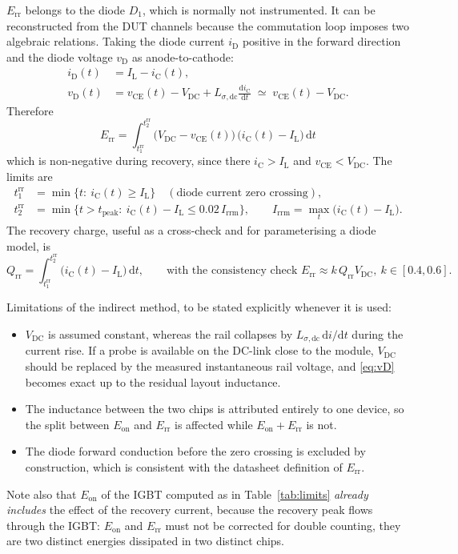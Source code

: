 \documentclass[11pt,a4paper]{article}
\newcommand{\Eon}{E_{\mathrm{on}}}
\newcommand{\Err}{E_{\mathrm{rr}}}
\newcommand{\vce}{v_{\mathrm{CE}}}
\newcommand{\ic}{i_{\mathrm{C}}}
\newcommand{\Vdc}{V_{\mathrm{DC}}}
\newcommand{\IL}{I_{\mathrm{L}}}
\begin{document}
$\Err$ belongs to the diode $D_1$, which is normally not instrumented. It can be
reconstructed from the DUT channels because the commutation loop imposes two algebraic
relations. Taking the diode current $i_{\mathrm{D}}$ positive in the forward direction and
the diode voltage $v_{\mathrm{D}}$ as anode-to-cathode:
\begin{align}
i_{\mathrm{D}}(t) &= \IL - \ic(t), \label{eq:iD}\\
v_{\mathrm{D}}(t) &= \vce(t) - \Vdc + L_{\sigma,\mathrm{dc}}\frac{\mathrm{d}\ic}{\mathrm{d}t}
\;\simeq\; \vce(t)-\Vdc . \label{eq:vD}
\end{align}
Therefore
\begin{equation}
\boxed{\;
\Err = \int_{t_1^{\mathrm{rr}}}^{t_2^{\mathrm{rr}}}
\big(\Vdc-\vce(t)\big)\,\big(\ic(t)-\IL\big)\,\mathrm{d}t \;}
\label{eq:Err}
\end{equation}
which is non-negative during recovery, since there $\ic>\IL$ and $\vce<\Vdc$. The limits
are
\begin{align}
t_1^{\mathrm{rr}} &= \min\{t:\ \ic(t)\ge \IL\} \quad(\text{diode current zero crossing}),\\
t_2^{\mathrm{rr}} &= \min\{t>t_{\mathrm{peak}}:\ \ic(t)-\IL \le 0.02\,I_{\mathrm{rrm}}\},
\qquad I_{\mathrm{rrm}}=\max_t\big(\ic(t)-\IL\big).
\end{align}
The recovery charge, useful as a cross-check and for parameterising a diode model, is
\begin{equation}
Q_{\mathrm{rr}}=\int_{t_1^{\mathrm{rr}}}^{t_2^{\mathrm{rr}}}\big(\ic(t)-\IL\big)\,\mathrm{d}t,
\qquad \text{with the consistency check } \Err \approx k\,Q_{\mathrm{rr}}\Vdc,\ k\in[0.4,0.6].
\end{equation}

Limitations of the indirect method, to be stated explicitly whenever it is used:
\begin{itemize}
\item $\Vdc$ is assumed constant, whereas the rail collapses by
$L_{\sigma,\mathrm{dc}}\,\mathrm{d}i/\mathrm{d}t$ during the current rise. If a probe is
available on the DC-link close to the module, $\Vdc$ should be replaced by the measured
instantaneous rail voltage, and \eqref{eq:vD} becomes exact up to the residual layout
inductance.
\item The inductance between the two chips is attributed entirely to one device, so the
split between $\Eon$ and $\Err$ is affected while $\Eon+\Err$ is not.
\item The diode forward conduction before the zero crossing is excluded by construction,
which is consistent with the datasheet definition of $\Err$.
\end{itemize}
Note also that $\Eon$ of the IGBT computed as in Table~\ref{tab:limits} \emph{already
includes} the effect of the recovery current, because the recovery peak flows through the
IGBT: $\Eon$ and $\Err$ must not be corrected for double counting, they are two distinct
energies dissipated in two distinct chips.
\end{document}
